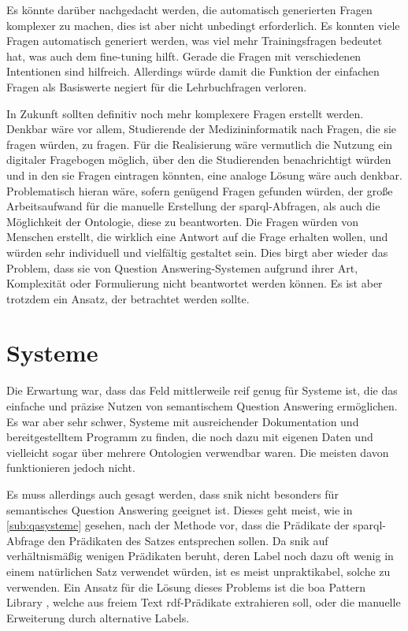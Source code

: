 Es könnte darüber nachgedacht werden, die automatisch generierten Fragen komplexer zu machen, dies ist aber nicht unbedingt erforderlich.
Es konnten viele Fragen automatisch generiert werden, was viel mehr Trainingsfragen bedeutet hat, was auch dem fine-tuning hilft.
Gerade die Fragen mit verschiedenen Intentionen sind hilfreich.
Allerdings würde damit die Funktion der einfachen Fragen als Basiswerte negiert für die Lehrbuchfragen verloren. 

In Zukunft sollten definitiv noch mehr komplexere Fragen erstellt werden.
Denkbar wäre vor allem, Studierende der Medizininformatik nach Fragen, die sie fragen würden, zu fragen.
Für die Realisierung wäre vermutlich die Nutzung ein digitaler Fragebogen möglich, über den die Studierenden benachrichtigt würden und in den sie Fragen eintragen könnten,
eine analoge Lösung wäre auch denkbar.
Problematisch hieran wäre, sofern genügend Fragen gefunden würden, der große Arbeitsaufwand für die manuelle Erstellung der \ac{sparql}-Abfragen, als auch die Möglichkeit der Ontologie, diese zu beantworten.
Die Fragen würden von Menschen erstellt, die wirklich eine Antwort auf die Frage erhalten wollen, und würden sehr individuell und vielfältig gestaltet sein.
Dies birgt aber wieder das Problem, dass sie von Question Answering-Systemen aufgrund ihrer Art, Komplexität oder Formulierung nicht beantwortet werden können.
Es ist aber trotzdem ein Ansatz, der betrachtet werden sollte.

\section{Systeme}

Die Erwartung war, dass das Feld mittlerweile reif genug für Systeme ist, die das einfache und präzise Nutzen von semantischem Question Answering ermöglichen.
Es war aber sehr schwer, Systeme mit ausreichender Dokumentation und bereitgestelltem Programm zu finden, die noch dazu mit eigenen Daten und vielleicht sogar über mehrere Ontologien verwendbar waren.
Die meisten davon funktionieren jedoch nicht.

Es muss allerdings auch gesagt werden, dass \ac{snik} nicht besonders für semantisches Question Answering geeignet ist.
Dieses geht meist, wie in \cref{sub:qasysteme} gesehen, nach der Methode vor, dass die Prädikate der \ac{sparql}-Abfrage den Prädikaten des Satzes entsprechen sollen.
Da \ac{snik} auf verhältnismäßig wenigen Prädikaten beruht, deren Label noch dazu oft wenig in einem natürlichen Satz verwendet würden, ist es meist unpraktikabel, solche zu verwenden.
Ein Ansatz für die Lösung dieses Problems ist die \ac{boa} Pattern Library \citep{boapatternlibrary}, welche aus freiem Text \ac{rdf}-Prädikate extrahieren soll, oder die manuelle Erweiterung durch alternative Labels.

